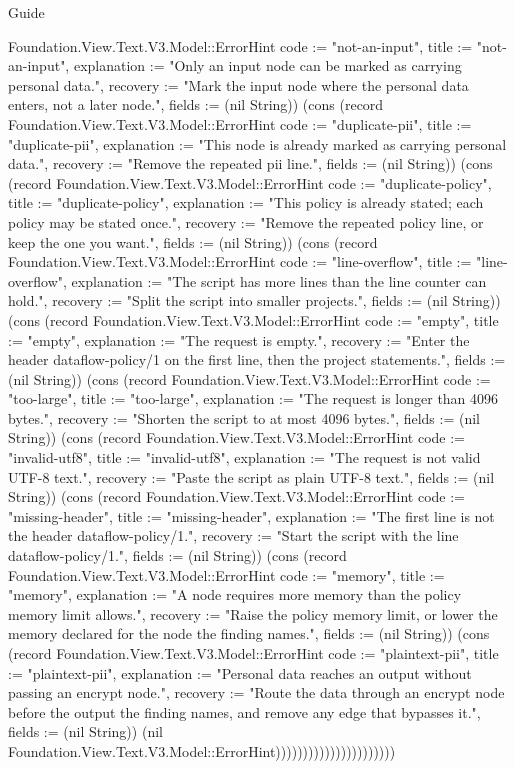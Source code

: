 \begin{lexlean}{Guide}
\begin{semanticmodule}
{Foundation.View.Text.V3.Model::ErrorHint {code := "not-an-input", title := "not-an-input", explanation := "Only an input node can be marked as carrying personal data.", recovery := "Mark the input node where the personal data enters, not a later node.", fields := (nil String)}) (cons (record Foundation.View.Text.V3.Model::ErrorHint {code := "duplicate-pii", title := "duplicate-pii", explanation := "This node is already marked as carrying personal data.", recovery := "Remove the repeated pii line.", fields := (nil String)}) (cons (record Foundation.View.Text.V3.Model::ErrorHint {code := "duplicate-policy", title := "duplicate-policy", explanation := "This policy is already stated; each policy may be stated once.", recovery := "Remove the repeated policy line, or keep the one you want.", fields := (nil String)}) (cons (record Foundation.View.Text.V3.Model::ErrorHint {code := "line-overflow", title := "line-overflow", explanation := "The script has more lines than the line counter can hold.", recovery := "Split the script into smaller projects.", fields := (nil String)}) (cons (record Foundation.View.Text.V3.Model::ErrorHint {code := "empty", title := "empty", explanation := "The request is empty.", recovery := "Enter the header dataflow-policy/1 on the first line, then the project statements.", fields := (nil String)}) (cons (record Foundation.View.Text.V3.Model::ErrorHint {code := "too-large", title := "too-large", explanation := "The request is longer than 4096 bytes.", recovery := "Shorten the script to at most 4096 bytes.", fields := (nil String)}) (cons (record Foundation.View.Text.V3.Model::ErrorHint {code := "invalid-utf8", title := "invalid-utf8", explanation := "The request is not valid UTF-8 text.", recovery := "Paste the script as plain UTF-8 text.", fields := (nil String)}) (cons (record Foundation.View.Text.V3.Model::ErrorHint {code := "missing-header", title := "missing-header", explanation := "The first line is not the header dataflow-policy/1.", recovery := "Start the script with the line dataflow-policy/1.", fields := (nil String)}) (cons (record Foundation.View.Text.V3.Model::ErrorHint {code := "memory", title := "memory", explanation := "A node requires more memory than the policy memory limit allows.", recovery := "Raise the policy memory limit, or lower the memory declared for the node the finding names.", fields := (nil String)}) (cons (record Foundation.View.Text.V3.Model::ErrorHint {code := "plaintext-pii", title := "plaintext-pii", explanation := "Personal data reaches an output without passing an encrypt node.", recovery := "Route the data through an encrypt node before the output the finding names, and remove any edge that bypasses it.", fields := (nil String)}) (nil Foundation.View.Text.V3.Model::ErrorHint))))))))))))))))))))))
}


\end{semanticmodule}
\end{lexlean}
